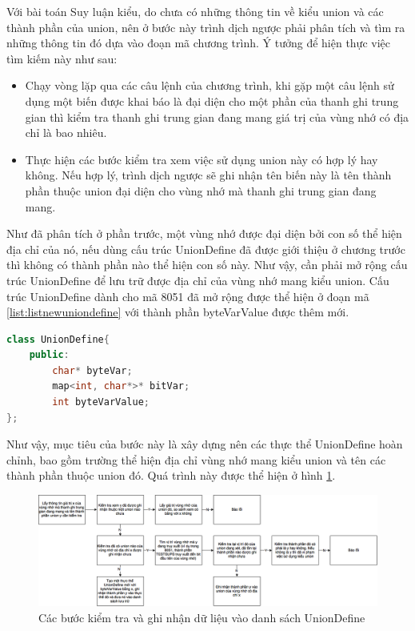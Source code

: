 Với bài toán Suy luận kiểu, do chưa có những thông tin về kiểu union và các thành phần của union, nên ở bước này trình dịch ngược phải phân tích và tìm ra những thông tin đó dựa vào đoạn mã chương trình. Ý tưởng để hiện thực việc tìm kiếm này như sau:
\begin{itemize}
	\item Chạy vòng lặp qua các câu lệnh của chương trình, khi gặp một câu lệnh sử dụng một biến được khai báo là đại diện cho một phần của thanh ghi trung gian thì kiểm tra thanh ghi trung gian đang mang giá trị của vùng nhớ có địa chỉ là bao nhiêu. 
	\item Thực hiện các bước kiểm tra xem việc sử dụng union này có hợp lý hay không. Nếu hợp lý, trình dịch ngược sẽ ghi nhận tên biến này là tên thành phần thuộc union đại diện cho vùng nhớ mà thanh ghi trung gian đang mang. 
\end{itemize}
Như đã phân tích ở phần trước, một vùng nhớ được đại diện bởi con số thể hiện địa chỉ của nó, nếu dùng cấu trúc UnionDefine đã được giới thiệu ở chương trước thì không có thành phần nào thể hiện con số này. Như vậy, cần phải mở rộng cấu trúc UnionDefine để lưu trữ được địa chỉ của vùng nhớ mang kiểu union. Cấu trúc UnionDefine dành cho mã 8051 đã mở rộng được thể hiện ở đoạn mã \ref{list:listnewuniondefine} với thành phần byteVarValue được thêm mới.
\begin{lstlisting}[caption={Đoạn mã mới của class UnionDefine},label={list:listnewuniondefine},language=c++]
class UnionDefine{
	public:
		char* byteVar;
		map<int, char*>* bitVar;
		int byteVarValue;
};
\end{lstlisting}
Như vậy, mục tiêu của bước này là xây dựng nên các thực thể UnionDefine hoàn chỉnh, bao gồm trường thể hiện địa chỉ vùng nhớ mang kiểu union và tên các thành phần thuộc union đó. Quá trình này được thể hiện ở hình \ref{fig:stepunionmaking}.
\begin{figure}[h]
	\centering
	\includegraphics[width=\linewidth]{image/stepUnionMaking}
	\caption{Các bước kiểm tra và ghi nhận dữ liệu vào danh sách UnionDefine}
	\label{fig:stepunionmaking}
\end{figure}

